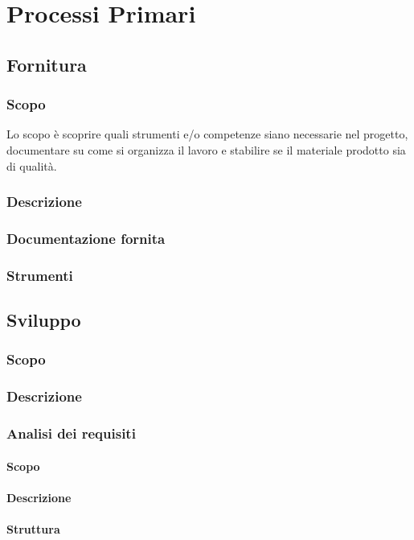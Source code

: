 \section{Processi Primari}
\subsection{Fornitura}
\subsubsection{Scopo}
Lo scopo è scoprire quali strumenti e/o competenze siano necessarie nel progetto, documentare su come si organizza il lavoro e stabilire se il materiale prodotto sia di qualità.

\subsubsection{Descrizione}
\subsubsection{Documentazione fornita}
\subsubsection{Strumenti}

\subsection{Sviluppo}
\subsubsection{Scopo}
\subsubsection{Descrizione}
\subsubsection{Analisi dei requisiti}
\paragraph{Scopo}
\paragraph{Descrizione}
\paragraph{Struttura}
